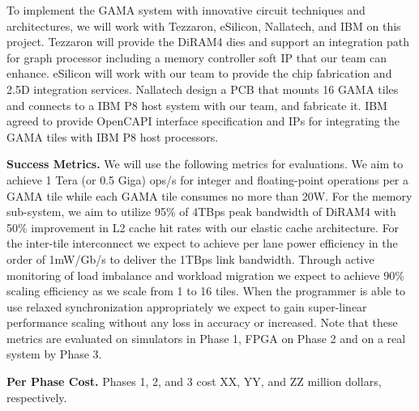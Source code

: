 

To implement the GAMA system with innovative circuit techniques and architectures, 
we will work with Tezzaron, eSilicon, Nallatech, and IBM on this project. 
Tezzaron will provide the DiRAM4 dies and support an integration path for graph processor including a memory controller soft IP that our team can enhance.
eSilicon will work with our team to provide the chip fabrication and 2.5D integration services.
Nallatech design a PCB that mounts 16 GAMA tiles and connects to a IBM P8 host system with our team, and fabricate it.
IBM agreed to provide OpenCAPI interface specification and IPs for integrating the GAMA tiles with IBM P8 host processors. 

\vspace{3pt}
\noindent
\textbf{Success Metrics.} 
We will use the following metrics for evaluations.
We aim to achieve 1 Tera (or 0.5 Giga) ops/s for integer and floating-point operations per a GAMA tile while each GAMA tile consumes no more than 20W.
For the memory sub-system, we aim to utilize 95\% of 4TBps peak bandwidth of DiRAM4 with 50\% improvement in L2 cache hit rates with our elastic cache architecture.
For the inter-tile interconnect we expect to achieve per lane power efficiency in the order of 1mW/Gb/s to deliver the 1TBps link bandwidth. %
Through active monitoring of load imbalance and workload migration we expect to achieve 90\% scaling efficiency as we scale from 1 to 16 tiles. 
When the programmer is able to use relaxed synchronization appropriately we expect to gain super-linear performance scaling without any loss in accuracy or increased.  
Note that these metrics are evaluated on simulators in Phase 1, FPGA on Phase 2 and on a real system by Phase 3.  


\vspace{3pt}
\noindent
\textbf{Per Phase Cost.} 
Phases 1, 2, and 3 cost XX, YY, and ZZ million dollars, respectively.


